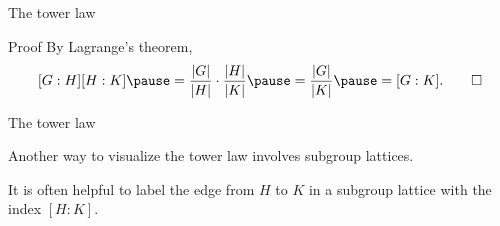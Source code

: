 \documentclass[8pt, handout]{beamer}
\newcommand{\Pause}{\pause}      %
\begin{document}
\begin{frame}{The tower law}
  \vspace{-2mm}\Pause
  
  \begin{exampleblock}{Proof}
    By Lagrange's theorem, 
    \[
      [G:H][H:K]\Pause=\frac{|G|}{|H|}\cdot\frac{|H|}{|K|}\Pause
      =\frac{|G|}{|K|}\Pause=[G:K]. \tag*{$\Box$}
      \] \vspace{-2mm}
  \end{exampleblock}

\end{frame}


\begin{frame}{The tower law}

  Another way to visualize the tower law involves subgroup lattices.

  \medskip\Pause

  It is often helpful to label the edge from $H$ to $K$ in a subgroup
  lattice with the index $[H:K]$.


\end{frame}
\end{document}
